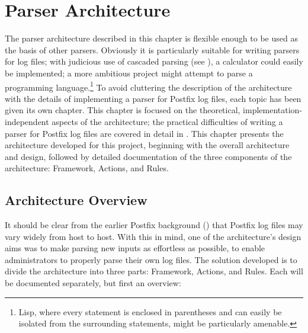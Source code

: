 \chapter{Parser Architecture}

\label{parser architecture}

The parser architecture described in this chapter is flexible enough to be
used as the basis of other parsers.  Obviously it is particularly suitable
for writing parsers for log files; with judicious use of cascaded parsing
(see ), a calculator could easily be
implemented; a more ambitious project might attempt to parse a programming
language.\footnote{Lisp, where every statement is enclosed in parentheses
and can easily be isolated from the surrounding statements, might be
particularly amenable.}  To avoid cluttering the description of the
architecture with the details of implementing a parser for Postfix log
files, each topic has been given its own chapter.  This chapter is focused
on the theoretical, implementation-independent aspects of the architecture;
the practical difficulties of writing a parser for Postfix log files are
covered in detail in .  This
chapter presents the architecture developed for this project, beginning
with the overall architecture and design, followed by detailed
documentation of the three components of the architecture: Framework,
Actions, and Rules.

\section{Architecture Overview}

\label{parser design}

It should be clear from the earlier Postfix background () that Postfix log files may vary widely from host to host.
With this in mind, one of the architecture's design aims was to make
parsing new inputs as effortless as possible, to enable administrators to
properly parse their own log files.  The solution developed is to divide
the architecture into three parts: Framework, Actions, and Rules.  Each
will be documented separately, but first an overview:

